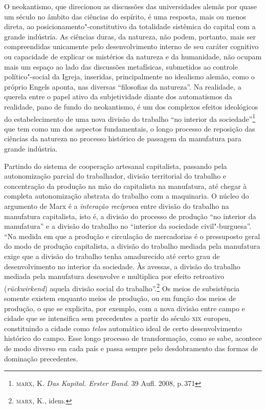 O neokantismo, que direcionou as discussões das universidades alemãs por
quase um século no âmbito das ciências do espírito, é uma resposta, mais
ou menos direta, ao posicionamento"-constitutivo da totalidade
sistêmica do capital com a grande indústria. As ciências duras, da
natureza, não podem, portanto, mais ser compreendidas unicamente pelo
desenvolvimento interno de seu caráter cognitivo ou capacidade de
explicar os mistérios da natureza e da humanidade, não ocupam mais um
espaço ao lado das discussões metafísicas, submetidos ao controle
político"-social da Igreja, inseridas, principalmente no idealismo
alemão, como o próprio Engels aponta, nas diversas ``filosofias da
natureza''. Na realidade, a querela entre o papel ativo da subjetividade
diante dos automatismos da realidade, pano de fundo do neokantismo, é um
dos complexos efeitos ideológicos do estabelecimento de uma nova divisão
do trabalho ``no interior da sociedade''\footnote{\textsc{marx}, K. \textit{Das Kapital. Erster Band}. 39 Aufl. 2008, p.\,371} que tem como um dos aspectos fundamentais, o longo processo de reposição das ciências da natureza no processo histórico de passagem da
manufatura para grande indústria.

Partindo do sistema de cooperação artesanal capitalista, passando pela
autonomização parcial do trabalhador, divisão territorial do trabalho e
concentração da produção na mão do capitalista na manufatura, até chegar
à completa autonomização abstrata do trabalho com a maquinaria. O núcleo
do argumento de Marx é a \emph{interação recíproca} entre divisão do
trabalho na manufatura capitalista, isto é, a divisão do processo de
produção ``no interior da manufatura'' e a divisão do trabalho no
``interior da sociedade civil"-burguesa''. ``Na medida em que a produção
e circulação de mercadorias é o pressuposto geral do modo de produção
capitalista, a divisão do trabalho mediada pela manufatura exige que a
divisão do trabalho tenha amadurecido até certo grau de desenvolvimento
no interior da sociedade. Às avessas, a divisão do trabalho mediada pela
manufatura desenvolve e multiplica por efeito retroativo
(\emph{rückwirkend}) aquela divisão social do trabalho''.\footnote{\textsc{marx}, K., idem.} Os
meios de subsistência somente existem enquanto meios de produção, ou em
função dos meios de produção, o que se explicita, por exemplo, com a
nova divisão entre campo e cidade que se intensifica sem precedentes a
partir do século \textsc{xix} europeu, constituindo a cidade como
\emph{telos} automático ideal de certo desenvolvimento histórico do
campo. Esse longo processo de transformação, como se sabe, acontece de
modo diverso em cada país e passa sempre pelo desdobramento das formas
de dominação precedentes.

